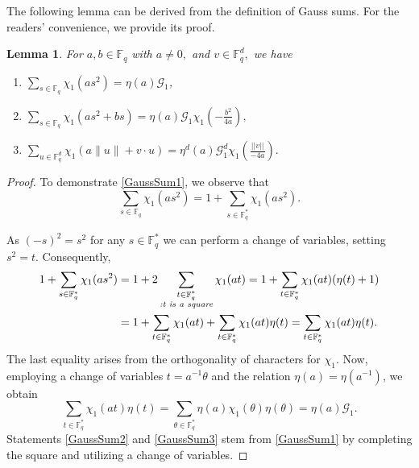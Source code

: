 \documentclass[a4paper,11pt]{amsart}
\numberwithin{equation}{section}
\newtheorem{lemma}[theorem]{Lemma}
\begin{document}
The following lemma can be derived from the definition of Gauss sums. For the readers' convenience, we provide its proof.
\begin{lemma}\label{GaussSum}
For $a, b\in\mathbb F_q$ with $a\ne 0,$ and $v\in\mathbb F_q^d,$ we have
\begin{enumerate}[label=\textup{(\arabic*)}]
\item
\label{GaussSum1}
$\displaystyle \sum_{s\in\mathbb F_q}\chi_1(as^2)=\eta(a)\mathcal{G}_1$,
\item

\label{GaussSum2}
$\displaystyle \sum_{s\in \mathbb F_q}\chi_1(as^2+bs)
=\eta(a)\mathcal{G}_1\chi_1\left(-\frac{b^2}{4a}\right),$

\item
\label{GaussSum3}
$\displaystyle \sum_{u\in\mathbb{F}_q^d}
 \chi_1\left(a\|u\|+v\cdot u\right)=\eta^d(a)  \mathcal{G}_1^d  \chi_1\left(\frac{||v||}{-4a}\right).$

\end{enumerate}
\end{lemma}
\begin{proof}



To demonstrate \ref{GaussSum1}, we observe that
\begin{equation*}
\sum_{s\in\mathbb F_q}\chi_1(as^2)
=1+\sum_{s\in\mathbb F_q^*}\chi_1(as^2).
\end{equation*}

As $(-s)^2=s^2$ for any $s\in\mathbb F_q^*$ we can perform a change of variables, setting $s^2 = t$. Consequently,
\begin{align*}
1+\sum_{s\in\mathbb F_q^*}\chi_1(as^2)
&=1+2\sum_{\substack{t\in\mathbb F_q^*
 \\\emph{:t is a square}}}\chi_1(at) = 1+\sum_{t\in\mathbb F_q^*}\chi_1(at)(\eta(t)+1)\\
&=1+\sum_{t\in\mathbb F_q^*}\chi_1(at)
 +\sum_{t\in\mathbb F_q^*}\chi_1(at)\eta(t) = \sum_{t\in\mathbb F_q^*}\chi_1(at)\eta(t).
\end{align*}
The last equality arises from the orthogonality of characters for $\chi_1$. Now, employing a change of variables $t = a^{-1}\theta$ and the relation $\eta(a)=\eta(a^{-1})$, we obtain \begin{equation*}
\sum_{t\in\mathbb F_q^*}\chi_1(at)\eta(t)
=\sum_{\theta\in\mathbb F_q^*}\eta(a)\chi_1(\theta)\eta(\theta)=\eta(a)\mathcal{G}_1.
\end{equation*}
Statements \ref{GaussSum2} and \ref{GaussSum3} stem from \ref{GaussSum1} by completing the square and utilizing a change of variables.
\end{proof}
\end{document}
